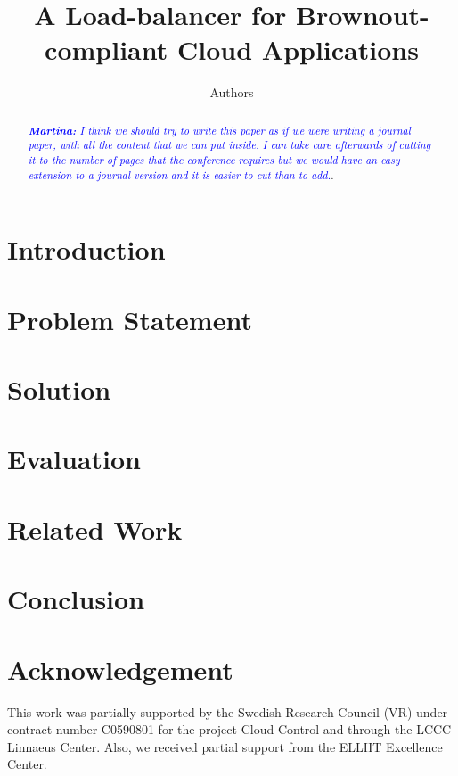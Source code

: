\documentclass[letterpaper, 10 pt, conference]{ieeeconf}
\title{\LARGE \bf A Load-balancer for Brownout-compliant Cloud Applications}
\author{Authors}
\begin{document}
\maketitle
\thispagestyle{empty}
\pagestyle{empty}

\begin{abstract}
  \textcolor{blue}{\textit{\textbf{Martina:} I think we should try to
      write this paper as if we were writing a journal paper, with all
      the content that we can put inside. I can take care afterwards
      of cutting it to the number of pages that the conference
      requires but we would have an easy extension to a journal
      version and it is easier to cut than to add.}}.
\end{abstract}

\section{Introduction}
\label{sec:introduction}


\section{Problem Statement}
\label{sec:problem}


\section{Solution}
\label{sec:solution}


\section{Evaluation}
\label{sec:evaluation}


\section{Related Work}
\label{sec:related}

\section{Conclusion}
\label{sec:conclusion}

\section*{Acknowledgement}
  This work was partially supported by the Swedish Research Council
  (VR) under contract number C0590801 for the project Cloud Control
  and through the LCCC Linnaeus Center. Also, we received partial
  support from the ELLIIT Excellence Center.

\printbibliography
\end{document}
